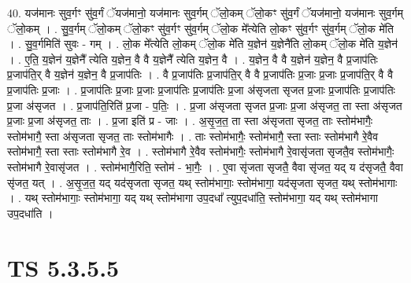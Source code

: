 \documentclass[17pt]{extarticle}
\begin{document}
40. यज॑मानः सुव॒र्गꣳ सु॑व॒र्गं ॅयज॑मानो॒ यज॑मानः सुव॒र्गम् ॅलो॒कम् ॅलो॒कꣳ सु॑व॒र्गं ॅयज॑मानो॒ यज॑मानः सुव॒र्गम् ॅलो॒कम् । . सु॒व॒र्गम् ॅलो॒कम् ॅलो॒कꣳ सु॑व॒र्गꣳ सु॑व॒र्गम् ॅलो॒क मे᳚त्येति लो॒कꣳ सु॑व॒र्गꣳ सु॑व॒र्गम् ॅलो॒क मे॑ति । . सु॒व॒र्गमिति॑ सुवः - गम् । . लो॒क मे᳚त्येति लो॒कम् ॅलो॒क मे॑ति य॒ज्ञेन॑ य॒ज्ञेनै॑ति लो॒कम् ॅलो॒क मे॑ति य॒ज्ञेन॑ । . ए॒ति॒ य॒ज्ञेन॑ य॒ज्ञेनै᳚ त्येति य॒ज्ञेन॒ वै वै य॒ज्ञेनै᳚ त्येति य॒ज्ञेन॒ वै । . य॒ज्ञेन॒ वै वै य॒ज्ञेन॑ य॒ज्ञेन॒ वै प्र॒जाप॑तिः प्र॒जाप॑ति॒र् वै य॒ज्ञेन॑ य॒ज्ञेन॒ वै प्र॒जाप॑तिः । . वै प्र॒जाप॑तिः प्र॒जाप॑ति॒र् वै वै प्र॒जाप॑तिः प्र॒जाः प्र॒जाः प्र॒जाप॑ति॒र् वै वै प्र॒जाप॑तिः प्र॒जाः । . प्र॒जाप॑तिः प्र॒जाः प्र॒जाः प्र॒जाप॑तिः प्र॒जाप॑तिः प्र॒जा अ॑सृजता सृजत प्र॒जाः प्र॒जाप॑तिः प्र॒जाप॑तिः प्र॒जा अ॑सृजत । . प्र॒जाप॑ति॒रिति॑ प्र॒जा - प॒तिः॒ । . प्र॒जा अ॑सृजता सृजत प्र॒जाः प्र॒जा अ॑सृजत॒ ता स्ता अ॑सृजत प्र॒जाः प्र॒जा अ॑सृजत॒ ताः । . प्र॒जा इति॑ प्र - जाः । . अ॒सृ॒ज॒त॒ ता स्ता अ॑सृजता सृजत॒ ताः स्तोम॑भागैः॒ स्तोम॑भागै॒ स्ता अ॑सृजता सृजत॒ ताः स्तोम॑भागैः । . ताः स्तोम॑भागैः॒ स्तोम॑भागै॒ स्ता स्ताः स्तोम॑भागै रे॒वैव स्तोम॑भागै॒ स्ता स्ताः स्तोम॑भागै रे॒व । . स्तोम॑भागै रे॒वैव स्तोम॑भागैः॒ स्तोम॑भागै रे॒वासृ॑जता सृजतै॒व स्तोम॑भागैः॒ स्तोम॑भागै रे॒वासृ॑जत । . स्तोम॑भागै॒रिति॒ स्तोम॑ - भा॒गैः॒ । . ए॒वा सृ॑जता सृजतै॒ वैवा सृ॑जत॒ यद् य द॑सृजतै॒ वैवा सृ॑जत॒ यत् । . अ॒सृ॒ज॒त॒ यद् यद॑सृजता सृजत॒ यथ् स्तोम॑भागाः॒ स्तोम॑भागा॒ यद॑सृजता सृजत॒ यथ् स्तोम॑भागाः । . यथ् स्तोम॑भागाः॒ स्तोम॑भागा॒ यद् यथ् स्तोम॑भागा उप॒दधा᳚ त्युप॒दधा॑ति॒ स्तोम॑भागा॒ यद् यथ् स्तोम॑भागा उप॒दधा॑ति । \newline
\pagebreak
{}

\section{ TS 5.3.5.5 }
\end{document}
